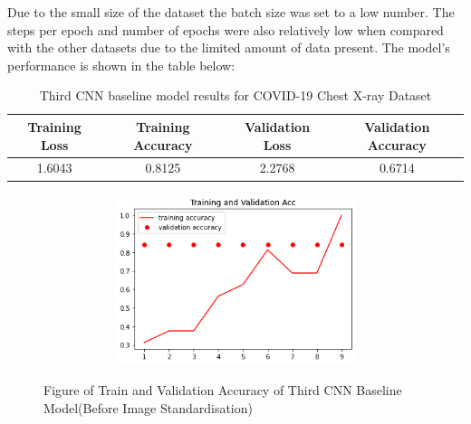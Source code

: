     \begin{table}[H]
    \centering
    \caption{Third CNN baseline model hyperparameters for COVID-19 Chest X-ray Dataset }
    \label{tab:Third CNN baseline model hyperparameters for COVID-19 Chest X-ray Dataset}
\end{table}
Due to the small size of the dataset the batch size was set to a low number. The steps per epoch and number of epochs were also relatively low when compared with the other datasets due to the limited amount of data present.  The model's performance is shown in the table below:
\begin{table}[H]
    \centering
    \begin{tabular}{|c|c|c|c|}
    \hline
         Training Loss
         & Training Accuracy 
         & Validation Loss
         & Validation Accuracy\\
         \hline
         1.6043  & 0.8125 & 2.2768 & 0.6714\\
         \hline
    \end{tabular}
    \caption{Third CNN baseline model results for COVID-19 Chest X-ray Dataset}
    \label{tab:Third CNN baseline model results for COVID-19 Chest X-ray Dataset}
\end{table}
 \begin{figure}[H]
    \centering
    \includegraphics[width=1\textwidth,height=5cm,keepaspectratio]{Images/ThirdCNNBaselineTrainAndValAccBeforePreprocessing.png}\\
    \caption{Figure of Train and Validation Accuracy of Third CNN Baseline Model(Before Image Standardisation)}
    \label{fig:Third CNN Baseline Train and Validation Accuracy(Before Image Standardisation)}
\end{figure}
